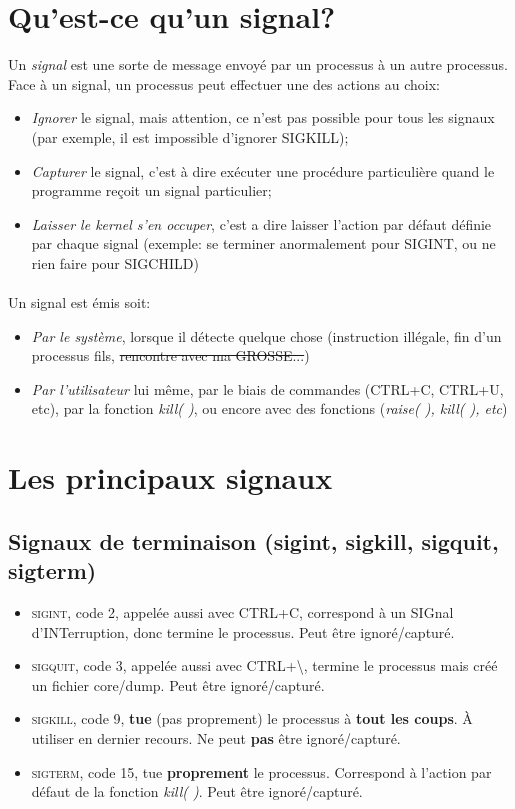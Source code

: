 \documentclass{report}
\begin{document}
\section{Qu'est-ce qu'un signal?}
Un \emph{signal} est une sorte de message envoyé par un processus à un autre processus. Face à un signal, un processus peut effectuer une des actions au choix:
\begin{itemize}
\item \emph{Ignorer} le signal, mais attention, ce n'est pas possible pour tous les signaux (par exemple, il est impossible d'ignorer \textsc{SIGKILL});
\item \emph{Capturer} le signal, c'est à dire exécuter une procédure particulière quand le programme reçoit un signal particulier;
\item \emph{Laisser le kernel s'en occuper}, c'est a dire laisser l'action par défaut définie par chaque signal (exemple: se terminer anormalement pour \textsc{SIGINT}, ou ne rien faire pour \textsc{SIGCHILD})
\end{itemize}
\paragraph{}
Un signal est émis soit:
\begin{itemize}
\item \emph{Par le système}, lorsque il détecte quelque chose (instruction illégale, fin d'un processus fils, \sout{rencontre avec ma GROSSE...})
\item \emph{Par l'utilisateur} lui même, par le biais de commandes (CTRL+C, CTRL+U, etc), par la fonction \emph{kill( )}, ou encore avec des fonctions (\emph{raise( ), kill( ), etc})
\end{itemize}

\section{Les principaux signaux}

\subsection{Signaux de terminaison (sigint, sigkill, sigquit, sigterm)}
\begin{itemize}
\item \textsc{sigint}, code 2, appelée aussi avec CTRL+C, correspond à un SIGnal d'INTerruption, donc termine le processus. Peut être ignoré/capturé.
\item \textsc{sigquit}, code 3, appelée aussi avec CTRL+\textbackslash, termine le processus mais créé un fichier core/dump. Peut être ignoré/capturé.
\item \textsc{sigkill}, code 9, \textbf{tue} (pas proprement) le processus à \textbf{tout les coups}. À utiliser en dernier recours. Ne peut \textbf{pas} être ignoré/capturé.
\item \textsc{sigterm}, code 15, tue \textbf{proprement} le processus. Correspond à l'action par défaut de la fonction \emph{kill( )}. Peut être ignoré/capturé.
\end{itemize}
\end{document}
